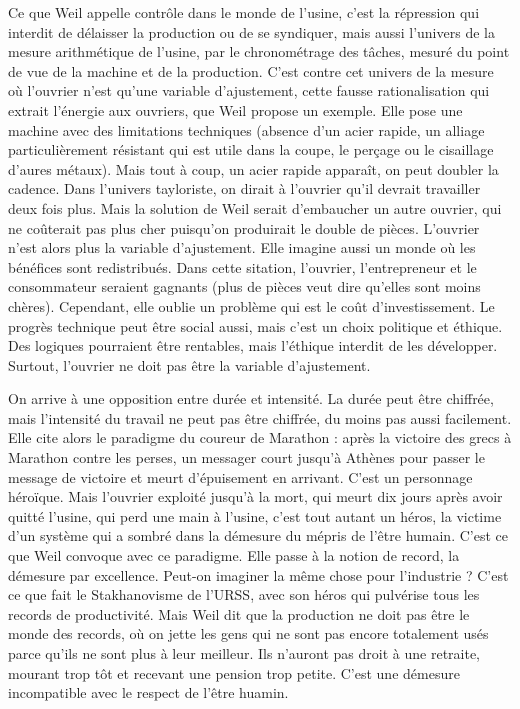 \documentclass[a4paper,12pt]{book}
\begin{document}
\par Ce que Weil appelle contrôle dans le monde de l'usine, c'est la répression qui interdit de délaisser la production ou de se syndiquer, mais aussi l'univers de la mesure arithmétique de l'usine, par le chronométrage des tâches, mesuré du point de vue de la machine et de la production. C'est contre cet univers de la mesure où l'ouvrier n'est qu'une variable d'ajustement, cette fausse rationalisation qui extrait l'énergie aux ouvriers, que Weil propose un exemple. Elle pose une machine avec des limitations techniques (absence d'un acier rapide, un alliage particulièrement résistant qui est utile dans la coupe, le perçage ou le cisaillage d'aures métaux). Mais tout à coup, un acier rapide apparaît, on peut doubler la cadence. Dans l'univers tayloriste, on dirait à l'ouvrier qu'il devrait travailler deux fois plus. Mais la solution de Weil serait d'embaucher un autre ouvrier, qui ne coûterait pas plus cher puisqu'on produirait le double de pièces. L'ouvrier n'est alors plus la variable d'ajustement. Elle imagine aussi un monde où les bénéfices sont redistribués. Dans cette sitation, l'ouvrier, l'entrepreneur et le consommateur seraient gagnants (plus de pièces veut dire qu'elles sont moins chères). Cependant, elle oublie un problème qui est le coût d'investissement. Le progrès technique peut être social aussi, mais c'est un choix politique et éthique. Des logiques pourraient être rentables, mais l'éthique interdit de les développer. Surtout, l'ouvrier ne doit pas être la variable d'ajustement.
\par On arrive à une opposition entre durée et intensité. La durée peut être chiffrée, mais l'intensité du travail ne peut pas être chiffrée, du moins pas aussi facilement. Elle cite alors le paradigme du coureur de Marathon : après la victoire des grecs à Marathon contre les perses, un messager court jusqu'à Athènes pour passer le message de victoire et meurt d'épuisement en arrivant. C'est un personnage héroïque. Mais l'ouvrier exploité jusqu'à la mort, qui meurt dix jours après avoir quitté l'usine, qui perd une main à l'usine, c'est tout autant un héros, la victime d'un système qui a sombré dans la démesure du mépris de l'être humain. C'est ce que Weil convoque avec ce paradigme. Elle passe à la notion de record, la démesure par excellence. Peut-on imaginer la même chose pour l'industrie ? C'est ce que fait le Stakhanovisme de l'URSS, avec son héros qui pulvérise tous les records de productivité. Mais Weil dit que la production ne doit pas être le monde des records, où on jette les gens qui ne sont pas encore totalement usés parce qu'ils ne sont plus à leur meilleur. Ils n'auront pas droit à une retraite, mourant trop tôt et recevant une pension trop petite. C'est une démesure incompatible avec le respect de l'être huamin.
\end{document}
